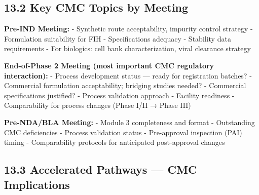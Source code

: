 \documentclass[
  11pt,
  a4paper,
]{report}
\begin{document}
\hypertarget{key-cmc-topics-by-meeting}{%
\subsection{13.2 Key CMC Topics by
Meeting}\label{key-cmc-topics-by-meeting}}

\textbf{Pre-IND Meeting:} - Synthetic route acceptability, impurity
control strategy - Formulation suitability for FIH - Specifications
adequacy - Stability data requirements - For biologics: cell bank
characterization, viral clearance strategy

\textbf{End-of-Phase 2 Meeting (most important CMC regulatory
interaction):} - Process development status --- ready for registration
batches? - Commercial formulation acceptability; bridging studies
needed? - Commercial specifications justified? - Process validation
approach - Facility readiness - Comparability for process changes (Phase
I/II → Phase III)

\textbf{Pre-NDA/BLA Meeting:} - Module 3 completeness and format -
Outstanding CMC deficiencies - Process validation status - Pre-approval
inspection (PAI) timing - Comparability protocols for anticipated
post-approval changes

\hypertarget{accelerated-pathways-cmc-implications}{%
\subsection{13.3 Accelerated Pathways --- CMC
Implications}\label{accelerated-pathways-cmc-implications}}
\end{document}
